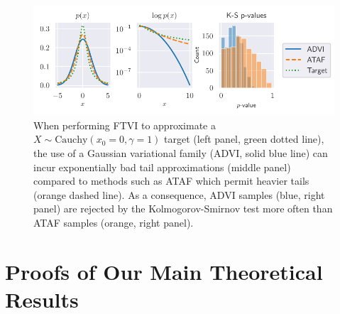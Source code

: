 \documentclass[nohyperref]{article}
\theoremstyle{plain}
\theoremstyle{definition}
\theoremstyle{remark}
\begin{document}
\begin{figure}[htbp]
  \centering
  \includegraphics{../Figures/fat_tail_ks.pdf}
  \vspace{-6mm}
  \caption{
    When performing FTVI to approximate a $X \sim \text{Cauchy}(x_0 = 0, \gamma = 1)$ target (left panel, green dotted line),
    the use of a Gaussian variational family (ADVI, solid blue line) can incur
    exponentially bad tail approximations (middle panel) compared to
    methods such as ATAF which permit heavier tails (orange dashed line).
    As a consequence, ADVI samples (blue, right panel) are rejected by
    the Kolmogorov-Smirnov test more often than ATAF samples (orange, right panel).
  }
  \label{fig:cauchy_normal_student}
\end{figure}

\section{Proofs of Our Main Theoretical Results}
\label{sec:proofs}
\end{document}
